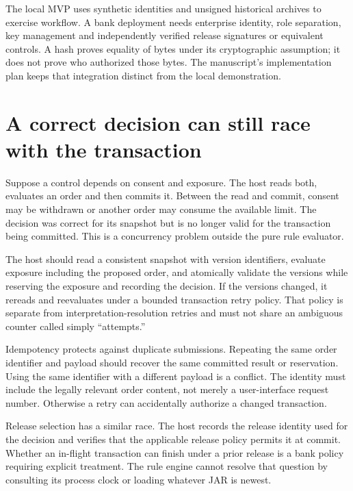 The local MVP uses synthetic identities and unsigned historical archives to
exercise workflow. A bank deployment needs enterprise identity, role separation,
key management and independently verified release signatures or equivalent
controls. A hash proves equality of bytes under its cryptographic assumption;
it does not prove who authorized those bytes. The manuscript's implementation
plan keeps that integration distinct from the local demonstration.

\section{A correct decision can still race with the transaction}
\label{merge:M07:13}


Suppose a control depends on consent and exposure. The host reads both, evaluates
an order and then commits it. Between the read and commit, consent may be
withdrawn or another order may consume the available limit. The decision was
correct for its snapshot but is no longer valid for the transaction being
committed. This is a concurrency problem outside the pure rule evaluator.

The host should read a consistent snapshot with version identifiers, evaluate
exposure including the proposed order, and atomically validate the versions while
reserving the exposure and recording the decision. If the versions changed, it
rereads and reevaluates under a bounded transaction retry policy. That policy is
separate from interpretation-resolution retries and must not share an ambiguous
counter called simply ``attempts.''


Idempotency protects against duplicate submissions. Repeating the same order
identifier and payload should recover the same committed result or reservation.
Using the same identifier with a different payload is a conflict. The identity
must include the legally relevant order content, not merely a user-interface
request number. Otherwise a retry can accidentally authorize a changed transaction.

Release selection has a similar race. The host records the release identity used
for the decision and verifies that the applicable release policy permits it at
commit. Whether an in-flight transaction can finish under a prior release is a
bank policy requiring explicit treatment. The rule engine cannot resolve that
question by consulting its process clock or loading whatever JAR is newest.

